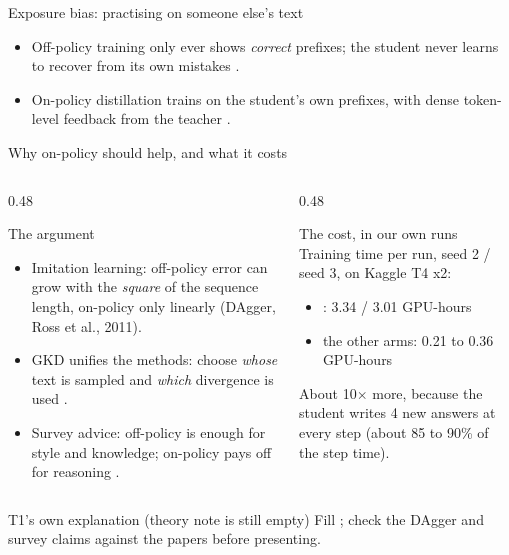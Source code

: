 \begin{frame}{Exposure bias: practising on someone else's text\hfill\est\ }
  \vspace{0.1cm}
  \begin{itemize}\small
    \item<2-> Off-policy training only ever shows \emph{correct} prefixes; the student
          never learns to recover from its own mistakes .
    \item<4-> On-policy distillation trains on the student's own prefixes, with dense
          token-level feedback from the teacher .
  \end{itemize}
\end{frame}

\begin{frame}{Why on-policy should help, and what it costs\hfill\est\ }
  \begin{columns}[T]
    \begin{column}{0.48\textwidth}
      \begin{block}{The argument}
        \footnotesize
        \begin{itemize}
          \item Imitation learning: off-policy error can grow with the
                \emph{square} of the sequence length, on-policy only
                linearly (DAgger, Ross et al., 2011).
          \item GKD unifies the methods: choose \emph{whose} text is
                sampled and \emph{which} divergence is used
                .
          \item Survey advice: off-policy is enough for style and
                knowledge; on-policy pays off for reasoning
                .
        \end{itemize}
      \end{block}
    \end{column}
    \begin{column}{0.48\textwidth}
      \begin{block}{The cost, in our own runs \ours}
        \footnotesize
        Training time per run, seed 2 / seed 3, on Kaggle T4 x2:
        \begin{itemize}
          \item {}: 3.34 / 3.01 GPU-hours
          \item the other arms: 0.21 to 0.36 GPU-hours
        \end{itemize}
        About 10$\times$ more, because the student writes 4 new answers
        at every step (about 85 to 90\% of the step time).
      \end{block}
    \end{column}
  \end{columns}
  \vspace{0.15cm}
  \begin{todobox}{T1's own explanation (theory note is still empty)}
    Fill ; check the
    DAgger and survey claims against the papers before presenting.
  \end{todobox}
\end{frame}
